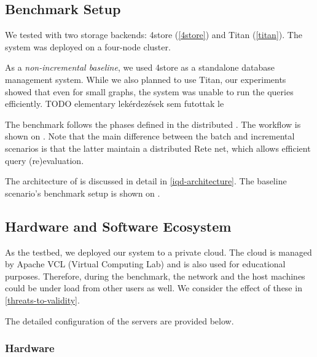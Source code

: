 \subsection{Benchmark Setup}

We tested \iqd{} with two storage backends: 4store (\autoref{4store}) and Titan (\autoref{titan}). The system was deployed on a four-node cluster.

As a \emph{non-incremental baseline}, we used 4store as a standalone database management system. While we also planned to use Titan, %
our experiments showed that even for small graphs, the system was unable to run the queries efficiently. TODO elementary lekérdezések sem futottak le


The benchmark follows the phases defined in the distributed \tb{}. The workflow is shown on . Note that the main difference between the batch and incremental scenarios is that the latter maintain a distributed Rete net, which allows efficient query (re)evaluation.   

The architecture of \iqd{} is discussed in detail in \autoref{iqd-architecture}. The baseline scenario's benchmark setup is shown on .


\subsection{Hardware and Software Ecosystem}
\label{ecosystem}

As the testbed, we deployed our system to a private cloud. The cloud is managed by Apache VCL (Virtual Computing Lab) and is also used for educational purposes. Therefore, during the benchmark, the network and the host machines could be under load from other users as well. We consider the effect of these in \autoref{threats-to-validity}.

The detailed configuration of the servers are provided below.

\subsubsection{Hardware}
 
